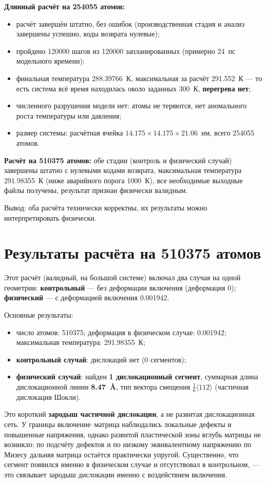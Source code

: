 \documentclass[12pt,a4paper]{extarticle}
\begin{document}
\smallskip
\noindent\textbf{Длинный расчёт на 254055 атомов:}
\begin{itemize}[leftmargin=1.4em,itemsep=2pt,topsep=2pt]
\item расчёт завершён штатно, без ошибок (производственная стадия и анализ завершены успешно, коды возврата нулевые);
\item пройдено 120000 шагов из 120000 запланированных (примерно 24~пс модельного времени);
\item финальная температура 288.39766~К, максимальная за расчёт 291.552~К — то есть система всё время находилась около заданных 300~К, \textbf{перегрева нет};
\item численного разрушения модели нет: атомы не теряются, нет аномального роста температуры или давления;
\item размер системы: расчётная ячейка $14.175 \times 14.175 \times 21.06$~нм, всего 254055 атомов.
\end{itemize}

\smallskip
\noindent\textbf{Расчёт на 510375 атомов:} обе стадии (контроль и физический случай) завершены штатно с нулевыми кодами возврата, максимальная температура 291.98355~К (ниже аварийного порога 1000~К), все необходимые выходные файлы получены, результат признан физически валидным.

\smallskip
\noindent Вывод: оба расчёта технически корректны, их результаты можно интерпретировать физически.

\section{Результаты расчёта на 510375 атомов}
Этот расчёт (валидный, на большой системе) включал два случая на одной геометрии: \textbf{контрольный} — без деформации включения (деформация 0); \textbf{физический} — с деформацией включения 0.001942.

\smallskip
Основные результаты:
\begin{itemize}[leftmargin=1.4em,itemsep=2pt,topsep=2pt]
\item число атомов: 510375; деформация в физическом случае: 0.001942; максимальная температура: 291.98355~К;
\item \textbf{контрольный случай}: дислокаций нет (0 сегментов);
\item \textbf{физический случай}: найден \textbf{1 дислокационный сегмент}, суммарная длина дислокационной линии \textbf{8.47~Å}, тип вектора смещения $\tfrac{1}{6}\langle 112\rangle$ (частичная дислокация Шокли).
\end{itemize}
Это короткий \textbf{зародыш частичной дислокации}, а не развитая дислокационная сеть. У границы включение--матрица наблюдались локальные дефекты и повышенные напряжения, однако развитой пластической зоны вглубь матрицы не возникло: по подсчёту дефектов и по низкому эквивалентному напряжению по Мизесу дальняя матрица остаётся практически упругой. Существенно, что сегмент появился именно в физическом случае и отсутствовал в контрольном, — это связывает зародыш дислокации именно с воздействием включения.
\end{document}
